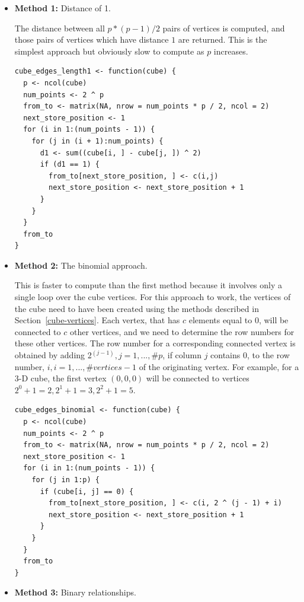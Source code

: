 \begin{itemize}

  \item {\bf Method 1:} Distance of 1.

    The distance between all $p * (p - 1) / 2$ pairs of vertices is
    computed, and those pairs of vertices which have distance $1$ are
    returned. This is the simplest approach but obviously slow to
    compute as $p$ increases.

\begin{verbatim}
cube_edges_length1 <- function(cube) {
  p <- ncol(cube)
  num_points <- 2 ^ p
  from_to <- matrix(NA, nrow = num_points * p / 2, ncol = 2)
  next_store_position <- 1
  for (i in 1:(num_points - 1)) {
    for (j in (i + 1):num_points) {
      d1 <- sum((cube[i, ] - cube[j, ]) ^ 2)
      if (d1 == 1) {
        from_to[next_store_position, ] <- c(i,j)
        next_store_position <- next_store_position + 1
      }
    }
  }
  from_to
}
\end{verbatim}

  \item {\bf Method 2:} The binomial approach.

    This is faster to compute than the first method because it
    involves only a single loop over the cube vertices. For this
    approach to work, the vertices of the cube need to have been
    created using the methods described in
    Section~\ref{cube-vertices}. Each vertex, that has $c$ elements
    equal to 0, will be connected to $c$ other vertices, and we need
    to determine the row numbers for these other vertices. The row
    number for a corresponding connected vertex is obtained by adding
    2$^{(j-1)}, j=1,...,\#p$, if column $j$ contains 0, to the row
    number, $i, i=1,...,\#vertices-1$ of the originating vertex. For
    example, for a 3-D cube, the first vertex $(0,0,0)$ will be
    connected to vertices $2^0+1=2, 2^1+1=3, 2^2+1=5$.

\begin{verbatim}
cube_edges_binomial <- function(cube) {
  p <- ncol(cube)
  num_points <- 2 ^ p
  from_to <- matrix(NA, nrow = num_points * p / 2, ncol = 2)
  next_store_position <- 1
  for (i in 1:(num_points - 1)) {
    for (j in 1:p) {
      if (cube[i, j] == 0) {
        from_to[next_store_position, ] <- c(i, 2 ^ (j - 1) + i)
        next_store_position <- next_store_position + 1
      }
    }
  }
  from_to
}
\end{verbatim}

  \item {\bf Method 3:} Binary relationships.


\end{itemize}
